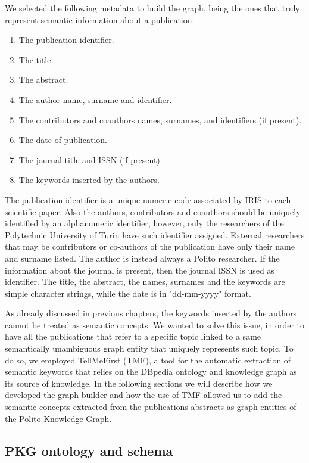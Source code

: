 \documentclass[%
    corpo=13.5pt,
    twoside,
    oldstyle,
    tipotesi=magistrale,
    greek,
    evenboxes
]{toptesi}
\begin{document}
We selected the following metadata to build the graph, being the ones that
truly represent semantic information about a publication:

\begin{enumerate}
    \item The publication identifier.
    \item The title.
    \item The abstract.
    \item The author name, surname and identifier.
    \item The contributors and coauthors names, surnames, and identifiers
        (if present).
    \item The date of publication.
    \item The journal title and ISSN (if present).
    \item The keywords inserted by the authors.
\end{enumerate}

The publication identifier is a unique numeric code associated by IRIS to each
scientific paper. Also the authors, contributors and coauthors should be
uniquely identified by an alphanumeric identifier, however, only the researchers
of the Polytechnic University of Turin have such identifier assigned. External
researchers that may be contributors or co-authors of the publication have only
their name and surname listed. The author is instead always a Polito researcher.
If the information about the journal is present, then the journal ISSN is
used as identifier.
The title, the abstract, the names, surnames and the keywords are simple
character strings, while the date is in "dd-mm-yyyy" format.

As already discussed in previous chapters, the keywords inserted by the authors
cannot be treated as semantic concepts. We wanted to solve this issue, in order
to have all the publications that refer to a specific topic linked to a
same semantically unambiguous graph entity that uniquely represents such topic.
To do so, we employed TellMeFirst (TMF), a tool for the automatic extraction of
semantic keywords that relies on the DBpedia ontology and knowledge graph as
its source of knowledge.
In the following sections we will describe how we developed the graph builder
and how the use of TMF allowed us to add the semantic concepts extracted from
the publications abstracts as graph entities of the Polito Knowledge Graph.


\subsection{PKG ontology and schema}
\end{document}
